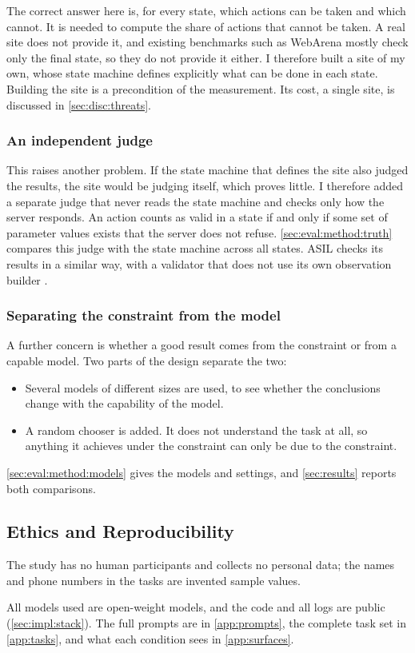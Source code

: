The correct answer here is, for every state, which actions can be taken and which cannot.
It is needed to compute the share of actions that cannot be taken.
A real site does not provide it, and existing benchmarks such as WebArena \cite{zhou2024webarena} mostly check only the final state, so they do not provide it either.
I therefore built a site of my own, whose state machine defines explicitly what can be done in each state.
Building the site is a precondition of the measurement. Its cost, a single site, is discussed in \autoref{sec:disc:threats}.

\subsubsection{An independent judge}\label{sec:methods:judge}

This raises another problem.
If the state machine that defines the site also judged the results, the site would be judging itself, which proves little.
I therefore added a separate judge that never reads the state machine and checks only how the server responds.
An action counts as valid in a state if and only if some set of parameter values exists that the server does not refuse.
\autoref{sec:eval:method:truth} compares this judge with the state machine across all states.
ASIL checks its results in a similar way, with a validator that does not use its own observation builder \cite{xie2026asil}.

\subsubsection{Separating the constraint from the model}\label{sec:methods:models}

A further concern is whether a good result comes from the constraint or from a capable model.
Two parts of the design separate the two:
\begin{itemize}
    \item Several models of different sizes are used, to see whether the conclusions change with the capability of the model.
    \item A random chooser is added. It does not understand the task at all, so anything it achieves under the constraint can only be due to the constraint.
\end{itemize}
\autoref{sec:eval:method:models} gives the models and settings, and \autoref{sec:results} reports both comparisons.

\subsection{Ethics and Reproducibility}\label{sec:methods:ethics}

The study has no human participants and collects no personal data; the names and phone numbers in the tasks are invented sample values.

All models used are open-weight models, and the code and all logs are public (\autoref{sec:impl:stack}).
The full prompts are in \autoref{app:prompts}, the complete task set in \autoref{app:tasks}, and what each condition sees in \autoref{app:surfaces}.

